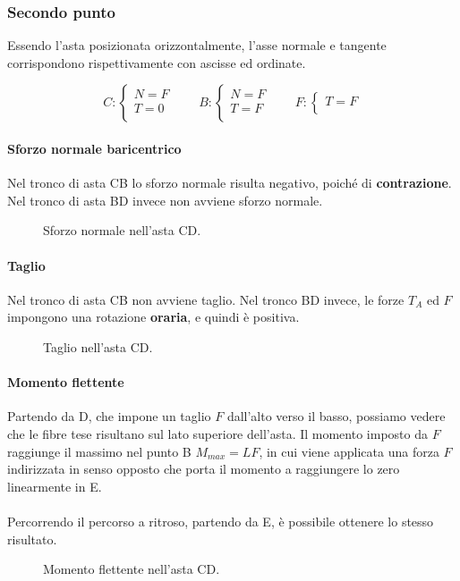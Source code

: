 \documentclass[main.tex]{subfiles}
\begin{document}
\subsubsection{Secondo punto}
Essendo l'asta posizionata orizzontalmente, l'asse normale e  tangente corrispondono rispettivamente con ascisse ed ordinate.

\[
	C: \begin{cases}
		N = F\\
		T = 0\\
	\end{cases}
	\qquad
	B: \begin{cases}
		N = F\\
		T = F\\
	\end{cases}
	\qquad
	F: \begin{cases}
		T = F\\
	\end{cases}
\]

\paragraph{Sforzo normale baricentrico} Nel tronco di asta CB lo sforzo normale risulta negativo, poiché di \textbf{contrazione}. Nel tronco di asta BD invece non avviene sforzo normale.

\begin{figure}[H]
\centering
\resizebox{.5\textwidth}{!}{}
\caption{Sforzo normale nell'asta CD.}
\end{figure}

\paragraph{Taglio} Nel tronco di asta CB non avviene taglio. Nel tronco BD invece, le forze $T_A$ ed $F$ impongono una rotazione \textbf{oraria}, e quindi è positiva.

\begin{figure}[H]
\centering
\resizebox{.5\textwidth}{!}{}
\caption{Taglio nell'asta CD.}
\end{figure}

\paragraph{Momento flettente} Partendo da D, che impone un taglio $F$ dall'alto verso il basso, possiamo vedere che le fibre tese risultano sul lato superiore dell'asta. Il momento imposto da $F$ raggiunge il massimo nel punto B $M_{max} = LF$, in cui viene applicata una forza $F$ indirizzata in senso opposto che porta il momento a raggiungere lo zero linearmente in E.
\\
\\
Percorrendo il percorso a ritroso, partendo da E, è possibile ottenere lo stesso risultato.

\begin{figure}[H]
\centering
\resizebox{.5\textwidth}{!}{}
\caption{Momento flettente nell'asta CD.}
\end{figure}
\end{document}
